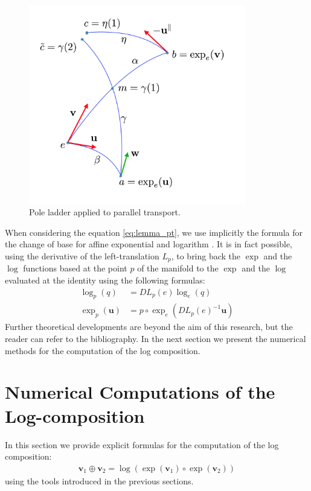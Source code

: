 \begin{figure}[htbp]
	\centering
	\includegraphics[width=9.5cm]{figures/theorem_pict.png}
	\caption{Pole ladder applied to parallel transport.}
	\label{fig:theorem_pict}
\end{figure}

When considering the equation \ref{eq:lemma_pt}, we use implicitly the formula for the change of base for affine exponential and logarithm \cite{arsigny2006bi}. It is in fact possible, using the derivative of the left-translation $L_{p}$, to bring back the $\exp$ and the $\log$ functions based at the point $p$ of the manifold to the $\exp$ and the $\log$ evaluated at the identity using the following formulas:
\begin{align}\label{eq:DL_DR}
\log _{p}(q)  &= DL_{p}(e) \log _{e}(q)  \\
\exp _{p}(\mathbf{u})  &= p\circ \exp_{e} (DL_{p}(e)^{-1} \mathbf{u})
\end{align}
\noindent
Further theoretical developments are beyond the aim of this research, but the reader can refer to the bibliography.
In the next section we present the numerical methods for the computation of the log composition.



\section{Numerical Computations of the Log-composition}

In this section we provide explicit formulas for the computation of the log composition:
\begin{align}\label{eq:general_numerical_log_composition}
\mathbf{v}_{1}\oplus \mathbf{v}_{2} =  \log(\exp(\mathbf{v}_1)\circ \exp(\mathbf{v}_2))
\end{align}
using the tools introduced in the previous sections.

